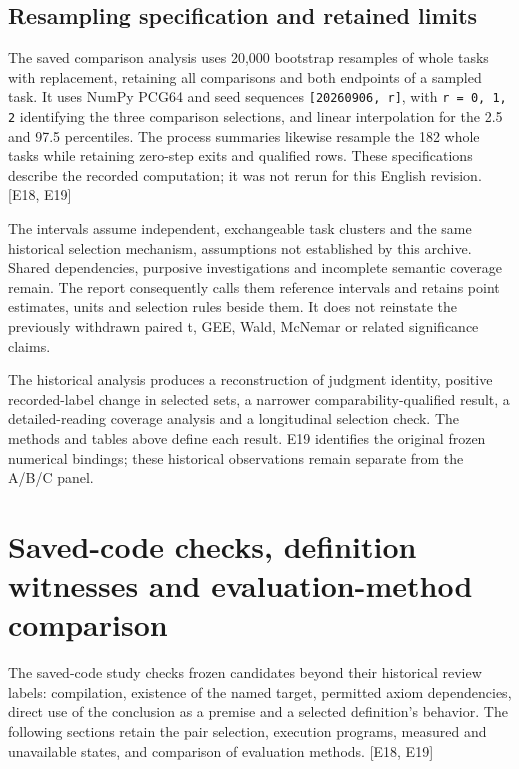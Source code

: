 \subsection[Resampling specification and retained limits]{\texorpdfstring{\protect\hypertarget{c9}{}Resampling specification and retained limits}{Resampling specification and retained limits}}
The saved comparison analysis uses 20,000 bootstrap resamples of whole tasks with replacement, retaining all comparisons and both endpoints of a sampled task. It uses NumPy PCG64 and seed sequences \nolinkurl{[20260906, r]}, with \nolinkurl{r = 0, 1, 2} identifying the three comparison selections, and linear interpolation for the 2.5 and 97.5 percentiles. The process summaries likewise resample the 182 whole tasks while retaining zero-step exits and qualified rows. These specifications describe the recorded computation; it was not rerun for this English revision. [E18, E19]

The intervals assume independent, exchangeable task clusters and the same historical selection mechanism, assumptions not established by this archive. Shared dependencies, purposive investigations and incomplete semantic coverage remain. The report consequently calls them reference intervals and retains point estimates, units and selection rules beside them. It does not reinstate the previously withdrawn paired t, GEE, Wald, McNemar or related significance claims.

The historical analysis produces a reconstruction of judgment identity, positive recorded-label change in selected sets, a narrower comparability-qualified result, a detailed-reading coverage analysis and a longitudinal selection check. The methods and tables above define each result. E19 identifies the original frozen numerical bindings; these historical observations remain separate from the A/B/C panel.

\section[Saved-code checks, definition witnesses and evaluation-method comparison]{\texorpdfstring{\protect\hypertarget{appendix-d}{}Saved-code checks, definition witnesses and evaluation-method comparison}{Saved-code checks, definition witnesses and evaluation-method comparison}}
The saved-code study checks frozen candidates beyond their historical review labels: compilation, existence of the named target, permitted axiom dependencies, direct use of the conclusion as a premise and a selected definition's behavior. The following sections retain the pair selection, execution programs, measured and unavailable states, and comparison of evaluation methods. [E18, E19]


